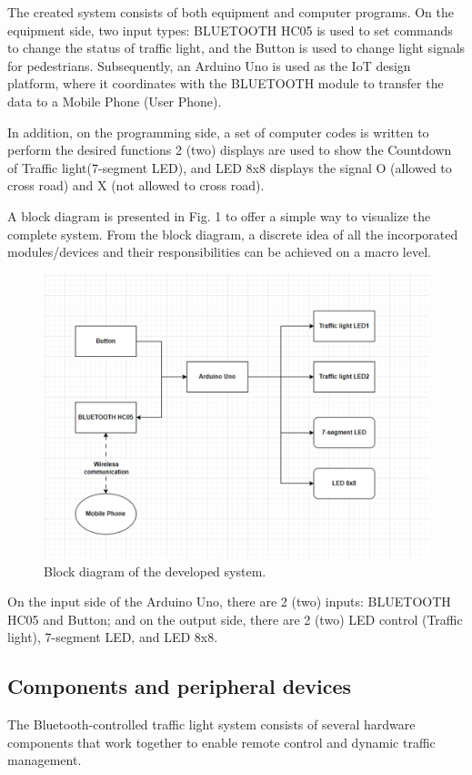 \documentclass[conference, onecolumn]{IEEEtran}
\begin{document}
The created system consists of both equipment and computer programs. On the equipment side, two input types: BLUETOOTH HC05 is used to set commands to change the status of traffic light, and the Button is used to change light signals for pedestrians. Subsequently, an Arduino Uno is used as the IoT design platform, where it coordinates with the BLUETOOTH module to transfer the data to a Mobile Phone (User Phone).\par
In addition, on the programming side, a set of computer codes is written to perform the desired functions 2 (two) displays are used to show the Countdown of Traffic light(7-segment LED), and LED 8x8 displays the signal O (allowed to cross road) and X (not allowed to cross road). \par
A block diagram is presented in Fig. 1 to offer a simple way to visualize the complete system. From the block diagram, a discrete idea of all the incorporated modules/devices and their responsibilities can be achieved on a macro level.\par
\begin{figure}[htbp]
\centerline{\includegraphics[width=6 in]{Block_diagram.png}}
\caption{Block diagram of the developed system.}
\label{fig}
\end{figure}


On the input side of the Arduino Uno, there are 2 (two) inputs: BLUETOOTH HC05 and Button; and on the output side, there are 2 (two) LED control (Traffic light), 7-segment LED, and LED 8x8.\par


\subsection{Components and peripheral devices}
The Bluetooth-controlled traffic light system consists of several hardware components that work together to enable remote control and dynamic traffic management.\par
\end{document}
